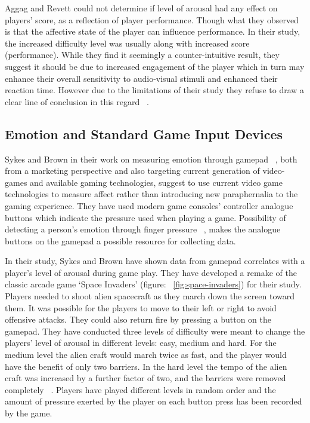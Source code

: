 Aggag and Revett could not determine if level of arousal had any effect on players' score, as a reflection of player performance. Though what they observed is that the affective state of the player can influence performance. In their study, the increased difficulty level was usually along with increased score (performance). While they find it seemingly a counter-intuitive result, they suggest it should be due to increased engagement of the player which in turn may enhance their overall sensitivity to audio-visual stimuli and enhanced their reaction time. However due to the limitations of their study they refuse to draw a clear line of conclusion in this regard ~\cite{aggag2011affective}.

\subsection{Emotion and Standard Game Input Devices}
Sykes and Brown in their work on measuring emotion through gamepad ~\cite{sykes2003affective}, both from a marketing perspective and also targeting current generation of video-games and available gaming technologies, suggest to use current video game technologies to measure affect rather than introducing new paraphernalia to the gaming experience. They have used modern game consoles' controller analogue buttons which indicate the pressure used when playing a game. Possibility of detecting a person's emotion through finger pressure ~\cite{clynes1977sentics}, makes the analogue buttons on the gamepad a possible resource for collecting data.

In their study, Sykes and Brown have shown data from gamepad correlates with a player's level of arousal during game play. They have developed a remake of the classic arcade game `Space Invaders' (figure: ~\ref{fig:space-invaders}) for their study. Players needed to shoot alien spacecraft as they march down the screen toward them. It was possible for the players to move to their left or right to avoid offensive attacks. They could also return fire by pressing a button on the gamepad. They have conducted three levels of difficulty were meant to change the players' level of arousal in different levels: easy, medium and hard. For the medium level the alien craft would march twice as fast, and the player would have the benefit of only two barriers. In the hard level the tempo of the alien craft was increased by a further factor of two, and the barriers were removed completely ~\cite{sykes2003affective}. Players have played different levels in random order and the amount of pressure exerted by the player on each button press has been recorded by the game.

